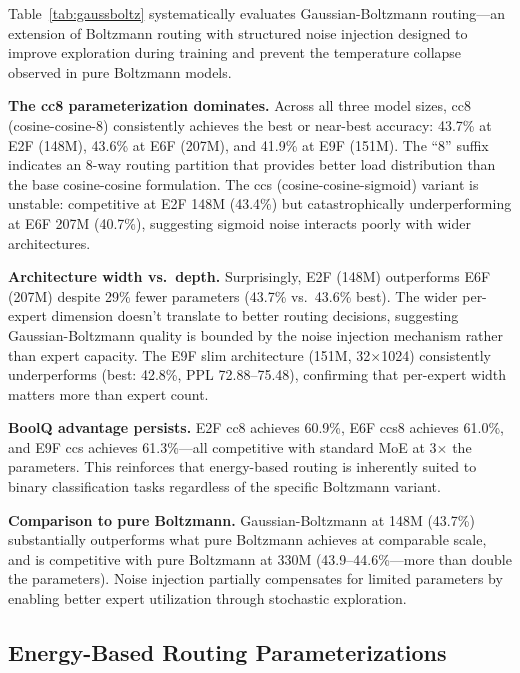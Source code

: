 \documentclass[oneside]{article}
\begin{document}
Table~\ref{tab:gaussboltz} systematically evaluates Gaussian-Boltzmann routing---an extension of Boltzmann routing with structured noise injection designed to improve exploration during training and prevent the temperature collapse observed in pure Boltzmann models.

\textbf{The cc8 parameterization dominates.} Across all three model sizes, cc8 (cosine-cosine-8) consistently achieves the best or near-best accuracy: 43.7\% at E2F (148M), 43.6\% at E6F (207M), and 41.9\% at E9F (151M). The ``8'' suffix indicates an 8-way routing partition that provides better load distribution than the base cosine-cosine formulation. The ccs (cosine-cosine-sigmoid) variant is unstable: competitive at E2F 148M (43.4\%) but catastrophically underperforming at E6F 207M (40.7\%), suggesting sigmoid noise interacts poorly with wider architectures.

\textbf{Architecture width vs.\ depth.} Surprisingly, E2F (148M) outperforms E6F (207M) despite 29\% fewer parameters (43.7\% vs.\ 43.6\% best). The wider per-expert dimension doesn't translate to better routing decisions, suggesting Gaussian-Boltzmann quality is bounded by the noise injection mechanism rather than expert capacity. The E9F slim architecture (151M, 32$\times$1024) consistently underperforms (best: 42.8\%, PPL 72.88--75.48), confirming that per-expert width matters more than expert count.

\textbf{BoolQ advantage persists.} E2F cc8 achieves 60.9\%, E6F ccs8 achieves 61.0\%, and E9F ccs achieves 61.3\%---all competitive with standard MoE at 3$\times$ the parameters. This reinforces that energy-based routing is inherently suited to binary classification tasks regardless of the specific Boltzmann variant.

\textbf{Comparison to pure Boltzmann.} Gaussian-Boltzmann at 148M (43.7\%) substantially outperforms what pure Boltzmann achieves at comparable scale, and is competitive with pure Boltzmann at 330M (43.9--44.6\%---more than double the parameters). Noise injection partially compensates for limited parameters by enabling better expert utilization through stochastic exploration.


\subsection{Energy-Based Routing Parameterizations}
\label{sec:energy_routing}
\end{document}
